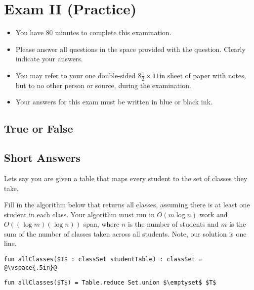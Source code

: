 \chapter[100]{Exam II (Practice)}
\label{ch:examii-practice}

\begin{preamble}
\begin{itemize}
\item You have 80 minutes to complete this examination.
\item Please answer all questions in the space provided with the
  question.  Clearly indicate your answers.
\item You may refer to your one double-sided $8\frac{1}{2} \times 11$in
  sheet of paper with notes, but to no other person or source, during the
  examination.

\item Your answers for this exam must be written in blue or black ink.

\end{itemize}
\end{preamble}


\section[10]{True or False}
%



\section{Short Answers}

%
\begin{problem}[4p][Classes]

Lets say you are given a table that maps every student to the set of
classes they take.  

\ask[4]
Fill in the algorithm below that returns all classes,
assuming there is at least one student in each class.  Your algorithm
must run in $O(m \log n)$ work and $O((\log m)(\log n))$ span, where
$n$ is the number of students and $m$ is the sum of the number of
classes taken across all students.    Note, our solution is one line.

\begin{lstlisting}[numbers=none]
fun allClasses($T$ : classSet studentTable) : classSet = 
@\vspace{.5in}@
\end{lstlisting}

\sol
\begin{lstlisting}[numbers=none]
fun allClasses($T$) = Table.reduce Set.union $\emptyset$ $T$
\end{lstlisting}
\end{problem}

